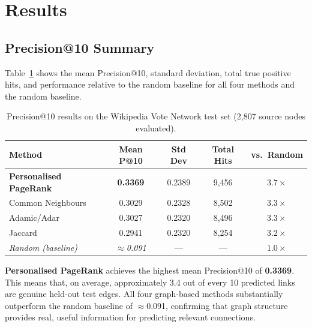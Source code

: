 \documentclass[10pt]{article}
\newcommand{\theadfont}{\bfseries\color{white}}
\begin{document}
\section{Results}
\label{sec:results}

\subsection{Precision@10 Summary}

Table~\ref{tab:results} shows the mean Precision@10, standard deviation, total true positive hits, and performance relative to the random baseline for all four methods and the random baseline.

\begin{table}[H]
  \centering
  \caption{Precision@10 results on the Wikipedia Vote Network test set (2,807 source nodes evaluated).}
  \label{tab:results}
  \begin{tabular}{l c c c c}
    \hline
    \rowcolor{brandblue}
    \theadfont Method &
    \theadfont Mean P@10 &
    \theadfont Std Dev &
    \theadfont Total Hits &
    \theadfont vs.\ Random \\
    \hline
    \rowcolor{softgreen}
    \textbf{Personalised PageRank} & \textbf{0.3369} & 0.2389 & 9,456 & $3.7\times$ \\
    Common Neighbours              & 0.3029 & 0.2328 & 8,502 & $3.3\times$ \\
    \rowcolor{lightblue}
    Adamic/Adar                    & 0.3027 & 0.2320 & 8,496 & $3.3\times$ \\
    Jaccard                        & 0.2941 & 0.2320 & 8,254 & $3.2\times$ \\
    \hline
    \rowcolor{lightgray}
    \textit{Random (baseline)}     & \textit{$\approx$0.091} & --- & --- & $1.0\times$ \\
    \hline
  \end{tabular}
\end{table}

\textbf{Personalised PageRank} achieves the highest mean Precision@10 of \textbf{0.3369}. This means that, on average, approximately 3.4 out of every 10 predicted links are genuine held-out test edges. All four graph-based methods substantially outperform the random baseline of $\approx$0.091, confirming that graph structure provides real, useful information for predicting relevant connections.
\end{document}
